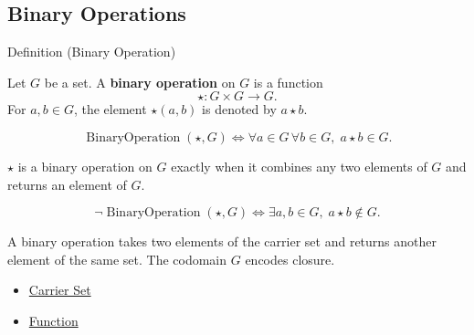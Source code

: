 \subsection*{Binary Operations}
\label{subsec:binary-operations}

\begin{definitionbox}{Definition (Binary Operation)}
\begin{definition}
\label{def:binary-operation}
Let $G$ be a set.
A \textbf{binary operation} on $G$ is a function
\[
\star : G \times G \to G.
\]
For $a,b \in G$, the element $\star(a,b)$ is denoted by $a \star b$.
\end{definition}
\end{definitionbox}

\begin{remark*}
\[
\operatorname{BinaryOperation}(\star,G)
\Longleftrightarrow
\forall a \in G\, \forall b \in G,\; a \star b \in G.
\]
\end{remark*}

\begin{remark*}
$\star$ is a binary operation on $G$ exactly when it combines any two elements
of $G$ and returns an element of $G$.
\end{remark*}

\begin{remark*}
\[
\neg\operatorname{BinaryOperation}(\star,G)
\Longleftrightarrow
\exists a,b\in G,\; a\star b\notin G.
\]
\end{remark*}

\begin{remark*}[Interpretation]
A binary operation takes two elements of the carrier set and returns another
element of the same set.  The codomain $G$ encodes closure.
\end{remark*}

\begin{dependencies}
\begin{itemize}
  \item \hyperref[def:carrier-set]{Carrier Set}
  \item \hyperref[def:alg-function]{Function}
\end{itemize}
\end{dependencies}
